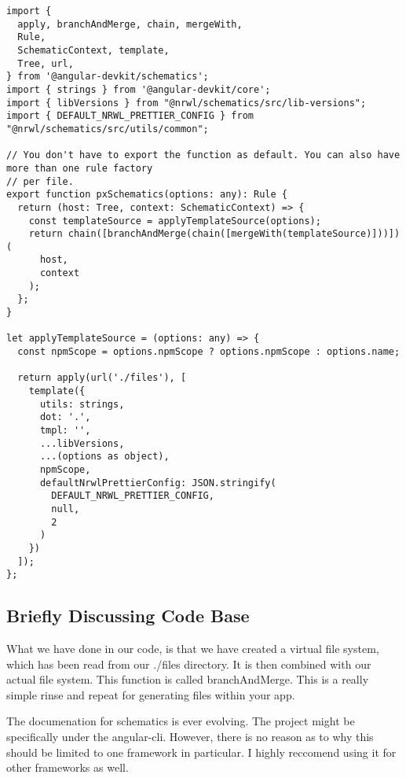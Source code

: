 \begin{lstlisting}
import {
  apply, branchAndMerge, chain, mergeWith,
  Rule,
  SchematicContext, template,
  Tree, url,
} from '@angular-devkit/schematics';
import { strings } from '@angular-devkit/core';
import { libVersions } from "@nrwl/schematics/src/lib-versions";
import { DEFAULT_NRWL_PRETTIER_CONFIG } from "@nrwl/schematics/src/utils/common";

// You don't have to export the function as default. You can also have more than one rule factory
// per file.
export function pxSchematics(options: any): Rule {
  return (host: Tree, context: SchematicContext) => {
    const templateSource = applyTemplateSource(options);
    return chain([branchAndMerge(chain([mergeWith(templateSource)]))])(
      host,
      context
    );
  };
}

let applyTemplateSource = (options: any) => {
  const npmScope = options.npmScope ? options.npmScope : options.name;

  return apply(url('./files'), [
    template({
      utils: strings,
      dot: '.',
      tmpl: '',
      ...libVersions,
      ...(options as object),
      npmScope,
      defaultNrwlPrettierConfig: JSON.stringify(
        DEFAULT_NRWL_PRETTIER_CONFIG,
        null,
        2
      )
    })
  ]);
};
\end{lstlisting}

\subsection{ Briefly Discussing Code Base}
What we have done in our code, is that we have created a virtual file system,
which has been read from our ./files directory. It is then combined with our
actual file system. This function is called branchAndMerge. This is a really
simple rinse and repeat for generating files within your app.

The documenation for schematics is ever evolving. The project might be
specifically under the angular-cli. However, there is no reason as to why this
should be limited to one framework in particular. I highly reccomend using it
for other frameworks as well.
